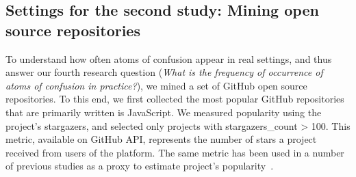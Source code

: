     
    
\subsection{Settings for the second study: Mining open source repositories}

To understand how often atoms of confusion appear in real settings, and thus answer our fourth research question (\emph{What is the frequency of occurrence of atoms of confusion in practice?}), we mined a set of GitHub open source repositories. To this end, we first collected the most popular GitHub repositories that are primarily written is JavaScript. We measured popularity using the project's stargazers, and selected only projects with stargazers\_count > 100. This metric, available on  GitHub API, represents the number of stars a project received from users of the platform. The same metric has been used in a number of previous studies as a proxy to estimate project's popularity~\cite{gyimesi2019bugsjs}.

